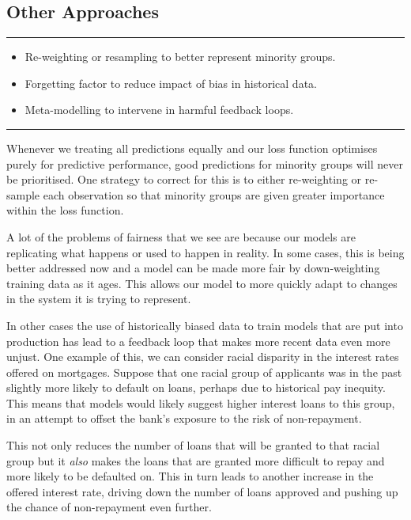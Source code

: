 \documentclass[
  12pt,
]{book}
\providecommand{\tightlist}{%
  \setlength{\itemsep}{0pt}\setlength{\parskip}{0pt}}
\begin{document}
\hypertarget{other-approaches}{%
\subsection{Other Approaches}\label{other-approaches}}

\begin{center}\rule{0.5\linewidth}{0.5pt}\end{center}

\begin{itemize}
\tightlist
\item
  Re-weighting or resampling to better represent minority groups.
\item
  Forgetting factor to reduce impact of bias in historical data.
\item
  Meta-modelling to intervene in harmful feedback loops.
\end{itemize}

\begin{center}\rule{0.5\linewidth}{0.5pt}\end{center}

Whenever we treating all predictions equally and our loss function optimises purely for predictive performance, good predictions for minority groups will never be prioritised. One strategy to correct for this is to either re-weighting or re-sample each observation so that minority groups are given greater importance within the loss function.

A lot of the problems of fairness that we see are because our models are replicating what happens or used to happen in reality. In some cases, this is being better addressed now and a model can be made more fair by down-weighting training data as it ages. This allows our model to more quickly adapt to changes in the system it is trying to represent.

In other cases the use of historically biased data to train models that are put into production has lead to a feedback loop that makes more recent data even more unjust.
One example of this, we can consider racial disparity in the interest rates offered on mortgages. Suppose that one racial group of applicants was in the past slightly more likely to default on loans, perhaps due to historical pay inequity. This means that models would likely suggest higher interest loans to this group, in an attempt to offset the bank's exposure to the risk of non-repayment.

This not only reduces the number of loans that will be granted to that racial group but it \emph{also} makes the loans that are granted more difficult to repay and more likely to be defaulted on. This in turn leads to another increase in the offered interest rate, driving down the number of loans approved and pushing up the chance of non-repayment even further.
\end{document}
